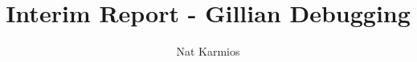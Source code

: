 \documentclass[a4paper, twoside]{report}
\title{Interim Report - Gillian Debugging}
\author{Nat Karmios}
\begin{document}
\def\chapterautorefname{\normalcolor{Chapter}\color{blue}}
\def\sectionautorefname{\normalcolor{\S}\kern-0.7ex\color{blue}}
\def\subsectionautorefname{\normalcolor{\S}\kern-0.7ex\color{blue}}
\def\figureautorefname{\normalcolor{Figure}\color{blue}}
\def\lstnumberautorefname{\normalcolor{line}\color{blue}}



\tableofcontents
\listoftodos
{}







\end{document}
